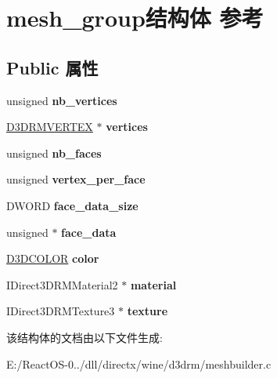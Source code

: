 \hypertarget{structmesh__group}{}\section{mesh\+\_\+group结构体 参考}
\label{structmesh__group}
\subsection*{Public 属性}
\begin{DoxyCompactItemize}
\item 
\mbox{\label{structmesh__group_a2f55c6d6af41a8a68da7b2994c5cc51a}} 
unsigned {\bfseries nb\+\_\+vertices}
\item 
\mbox{\label{structmesh__group_ab80d9e2224f2d11a22a0aa1552433679}} 
\hyperlink{struct___d3_d_r_m_v_e_r_t_e_x}{D3\+D\+R\+M\+V\+E\+R\+T\+EX} $\ast$ {\bfseries vertices}
\item 
\mbox{\label{structmesh__group_a4a8bb454372d57fbd5ef0b38bb0a4d66}} 
unsigned {\bfseries nb\+\_\+faces}
\item 
\mbox{\label{structmesh__group_a3fd2fa256be95f0c3b16c0f08d279965}} 
unsigned {\bfseries vertex\+\_\+per\+\_\+face}
\item 
\mbox{\label{structmesh__group_acab4552282ee926deeedcf429b6912d2}} 
D\+W\+O\+RD {\bfseries face\+\_\+data\+\_\+size}
\item 
\mbox{\label{structmesh__group_abdaceec089cc34c6ba3e48c0d1855c79}} 
unsigned $\ast$ {\bfseries face\+\_\+data}
\item 
\mbox{\label{structmesh__group_a42b535932e1527b6e6941eed91248d47}} 
\hyperlink{struct_d3_d_c_o_l_o_r}{D3\+D\+C\+O\+L\+OR} {\bfseries color}
\item 
\mbox{\label{structmesh__group_a6ca2a46a55aca66957f58a61c336ad9e}} 
I\+Direct3\+D\+R\+M\+Material2 $\ast$ {\bfseries material}
\item 
\mbox{\label{structmesh__group_aa582cf1c3e03a475910625ed69be8da3}} 
I\+Direct3\+D\+R\+M\+Texture3 $\ast$ {\bfseries texture}
\end{DoxyCompactItemize}


该结构体的文档由以下文件生成\+:\begin{DoxyCompactItemize}
\item 
E\+:/\+React\+O\+S-\/0../dll/directx/wine/d3drm/meshbuilder.\+c\end{DoxyCompactItemize}
